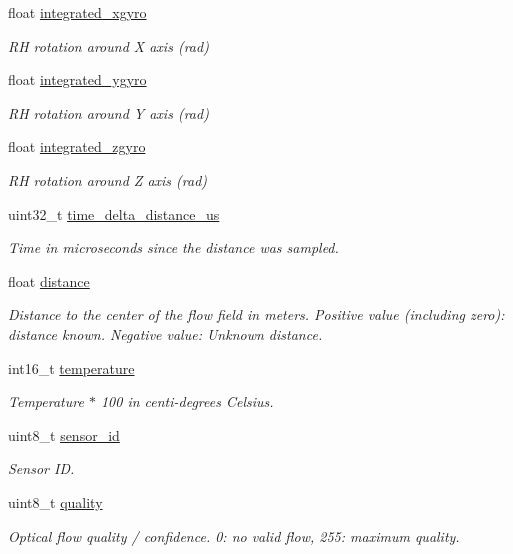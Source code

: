 \begin{DoxyCompactItemize}
float \hyperlink{struct____mavlink__hil__optical__flow__t_af9231c53a38dafaac5bc1337e1cf0508}{integrated\+\_\+xgyro}
\begin{DoxyCompactList}\small\item\em R\+H rotation around X axis (rad) \end{DoxyCompactList}\item 
float \hyperlink{struct____mavlink__hil__optical__flow__t_a31864b9e729286b1e081349f73a8be4e}{integrated\+\_\+ygyro}
\begin{DoxyCompactList}\small\item\em R\+H rotation around Y axis (rad) \end{DoxyCompactList}\item 
float \hyperlink{struct____mavlink__hil__optical__flow__t_a5c3d0e2fbc9e21580c7c29ce220c5cf0}{integrated\+\_\+zgyro}
\begin{DoxyCompactList}\small\item\em R\+H rotation around Z axis (rad) \end{DoxyCompactList}\item 
uint32\+\_\+t \hyperlink{struct____mavlink__hil__optical__flow__t_a6d8220168009f89f86db6b453c49e0a4}{time\+\_\+delta\+\_\+distance\+\_\+us}
\begin{DoxyCompactList}\small\item\em Time in microseconds since the distance was sampled. \end{DoxyCompactList}\item 
float \hyperlink{struct____mavlink__hil__optical__flow__t_aee005c2910873d3010551bc9f7507fa5}{distance}
\begin{DoxyCompactList}\small\item\em Distance to the center of the flow field in meters. Positive value (including zero)\+: distance known. Negative value\+: Unknown distance. \end{DoxyCompactList}\item 
int16\+\_\+t \hyperlink{struct____mavlink__hil__optical__flow__t_a51e9142908985d7517938256cc3b16e5}{temperature}
\begin{DoxyCompactList}\small\item\em Temperature $\ast$ 100 in centi-\/degrees Celsius. \end{DoxyCompactList}\item 
uint8\+\_\+t \hyperlink{struct____mavlink__hil__optical__flow__t_ac17ff8aa6f89d8bbed3915e21fb598a6}{sensor\+\_\+id}
\begin{DoxyCompactList}\small\item\em Sensor I\+D. \end{DoxyCompactList}\item 
uint8\+\_\+t \hyperlink{struct____mavlink__hil__optical__flow__t_a039f754e2192a783b41d3f6c2f62fe7d}{quality}
\begin{DoxyCompactList}\small\item\em Optical flow quality / confidence. 0\+: no valid flow, 255\+: maximum quality. \end{DoxyCompactList}\end{DoxyCompactItemize}


